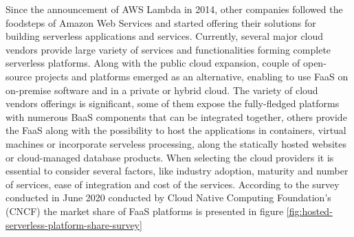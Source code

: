 Since the announcement of AWS Lambda in 2014, other companies followed the foodsteps of Amazon Web Services and started offering their solutions for building serverless applications and services. Currently, several major cloud vendors provide large variety of services and functionalities forming complete serverless platforms. Along with the public cloud expansion, couple of open-source projects and platforms emerged as an alternative, enabling to use FaaS on on-premise software and in a private or hybrid cloud. The variety of cloud vendors offerings is significant, some of them expose the fully-fledged platforms with numerous BaaS components that can be integrated together, others provide the FaaS along with the possibility to host the applications in containers, virtual machines or incorporate serveless processing, along the statically hosted websites or cloud-managed database products. When selecting the cloud providers it is essential to consider several factors, like industry adoption, maturity and number of services, ease of integration and cost of the services. According to the survey conducted in June 2020 conducted by Cloud Native Computing Foundation's (CNCF) \cite{CNCFServerlessSurvey2020} the market share of FaaS platforms is presented in figure \ref{fig:hosted-serverless-platform-share-survey}



